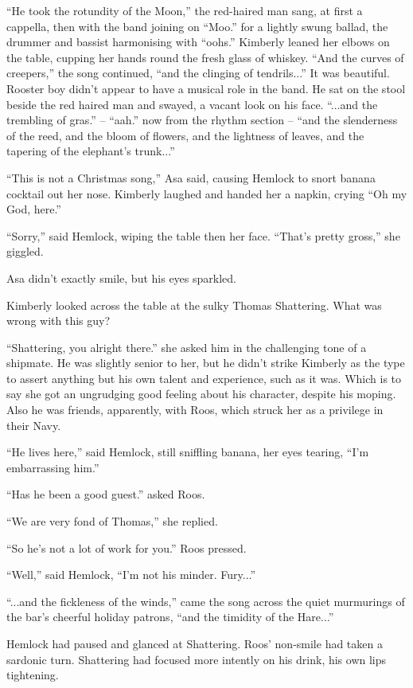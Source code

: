 \documentclass[11pt,a5paper]{article}
\begin{document}
``He took the rotundity of the Moon,'' the red-haired man sang, at first a cappella, then with the band joining on ``Moo.'' for a lightly swung ballad, the drummer and bassist harmonising with ``oohs.'' Kimberly leaned her elbows on the table, cupping her hands round the fresh glass of whiskey. ``And the curves of creepers,'' the song continued, ``and the clinging of tendrils...'' It was beautiful. Rooster boy didn't appear to have a musical role in the band. He sat on the stool beside the red haired man and swayed, a vacant look on his face. ``...and the trembling of gras.'' -- ``aah.'' now from the rhythm section -- ``and the slenderness of the reed, and the bloom of flowers, and the lightness of leaves, and the tapering of the elephant's trunk...''

``This is not a Christmas song,'' Asa said, causing Hemlock to snort banana cocktail out her nose. Kimberly laughed and handed her a napkin, crying ``Oh my God, here.''

``Sorry,'' said Hemlock, wiping the table then her face. ``That's pretty gross,'' she giggled.

Asa didn't exactly smile, but his eyes sparkled.

Kimberly looked across the table at the sulky Thomas Shattering. What was wrong with this guy?

``Shattering, you alright there.'' she asked him in the challenging tone of a shipmate. He was slightly senior to her, but he didn't strike Kimberly as the type to assert anything but his own talent and experience, such as it was. Which is to say she got an ungrudging good feeling about his character, despite his moping. Also he was friends, apparently, with Roos, which struck her as a privilege in their Navy.

``He lives here,'' said Hemlock, still sniffling banana, her eyes tearing, ``I'm embarrassing him.''

``Has he been a good guest.'' asked Roos.

``We are very fond of Thomas,'' she replied.

``So he's not a lot of work for you.'' Roos pressed.

``Well,'' said Hemlock, ``I'm not his minder. Fury...''

``...and the fickleness of the winds,'' came the song across the quiet murmurings of the bar's cheerful holiday patrons, ``and the timidity of the Hare...''

Hemlock had paused and glanced at Shattering. Roos' non-smile had taken a sardonic turn. Shattering had focused more intently on his drink, his own lips tightening.
\end{document}
